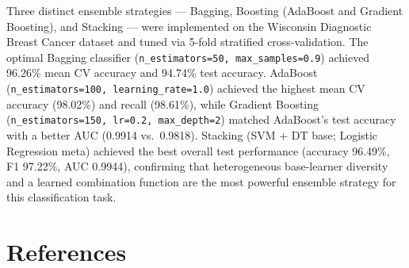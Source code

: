 \documentclass[12pt,a4paper]{article}
\begin{document}
Three distinct ensemble strategies --- Bagging, Boosting (AdaBoost and Gradient Boosting), and
Stacking --- were implemented on the Wisconsin Diagnostic Breast Cancer dataset and tuned via
5-fold stratified cross-validation. The optimal Bagging classifier
(\texttt{n\_estimators=50, max\_samples=0.9}) achieved 96.26\% mean CV accuracy and 94.74\% test
accuracy. AdaBoost (\texttt{n\_estimators=100, learning\_rate=1.0}) achieved the highest mean CV
accuracy (98.02\%) and recall (98.61\%), while Gradient Boosting (\texttt{n\_estimators=150,
lr=0.2, max\_depth=2}) matched AdaBoost's test accuracy with a better AUC (0.9914 vs.\ 0.9818).
Stacking (SVM + DT base; Logistic Regression meta) achieved the best overall test performance
(accuracy 96.49\%, F1 97.22\%, AUC 0.9944), confirming that heterogeneous base-learner
diversity and a learned combination function are the most powerful ensemble strategy for this
classification task.

\section{References}
\end{document}
